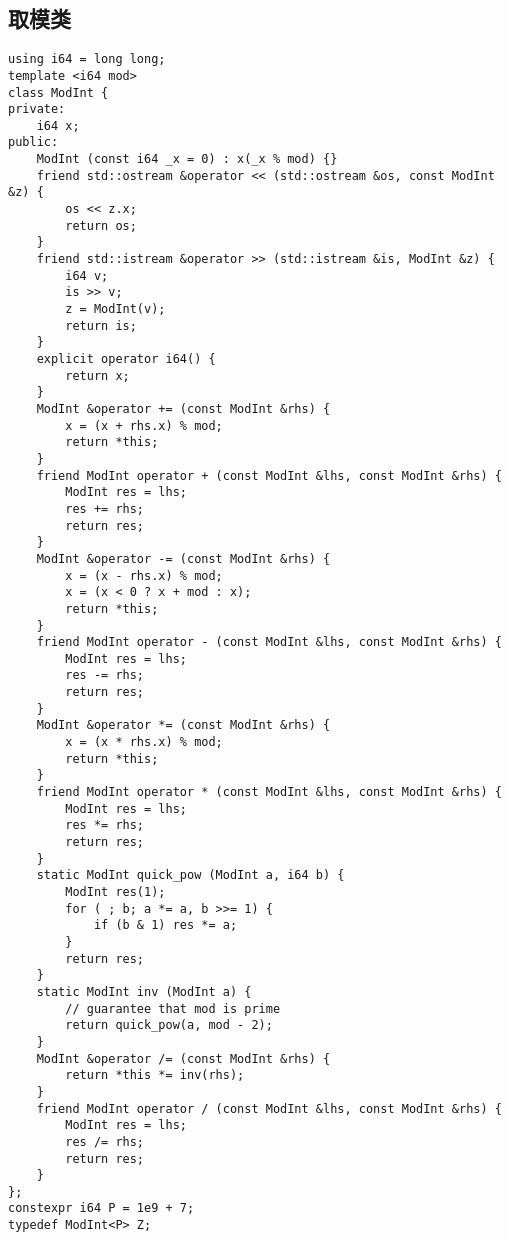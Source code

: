\documentclass{ctexart}
\begin{document}
\subsection{取模类}
\begin{verbatim}
using i64 = long long;
template <i64 mod>
class ModInt {
private:
    i64 x;
public:
    ModInt (const i64 _x = 0) : x(_x % mod) {}
    friend std::ostream &operator << (std::ostream &os, const ModInt &z) {
        os << z.x;
        return os;
    }
    friend std::istream &operator >> (std::istream &is, ModInt &z) {
        i64 v;
        is >> v;
        z = ModInt(v);
        return is;   
    }
    explicit operator i64() {
        return x;
    }
    ModInt &operator += (const ModInt &rhs) {
        x = (x + rhs.x) % mod;
        return *this;
    }
    friend ModInt operator + (const ModInt &lhs, const ModInt &rhs) {
        ModInt res = lhs;
        res += rhs;
        return res;
    }
    ModInt &operator -= (const ModInt &rhs) {
        x = (x - rhs.x) % mod;
        x = (x < 0 ? x + mod : x);
        return *this;
    }
    friend ModInt operator - (const ModInt &lhs, const ModInt &rhs) {
        ModInt res = lhs;
        res -= rhs;
        return res;
    }
    ModInt &operator *= (const ModInt &rhs) {
        x = (x * rhs.x) % mod;
        return *this;
    }
    friend ModInt operator * (const ModInt &lhs, const ModInt &rhs) {
        ModInt res = lhs;
        res *= rhs;
        return res;
    }
    static ModInt quick_pow (ModInt a, i64 b) {
        ModInt res(1);
        for ( ; b; a *= a, b >>= 1) {
            if (b & 1) res *= a;
        }
        return res;
    }
    static ModInt inv (ModInt a) {
        // guarantee that mod is prime
        return quick_pow(a, mod - 2);
    }
    ModInt &operator /= (const ModInt &rhs) {
        return *this *= inv(rhs);
    }
    friend ModInt operator / (const ModInt &lhs, const ModInt &rhs) {
        ModInt res = lhs;
        res /= rhs;
        return res;
    }
};
constexpr i64 P = 1e9 + 7;
typedef ModInt<P> Z;
\end{verbatim}
\end{document}
